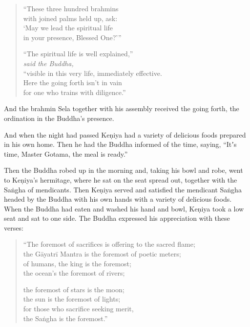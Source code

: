\documentclass[12pt,openany]{book}%
\newcommand*{\scspeaker}[1]{\hspace{2em}\textit{#1}}
\begin{document}
\begin{verse}
“These three hundred brahmins \\
with joined palms held up, ask: \\
‘May we lead the spiritual life \\
in your presence, Blessed One?’” 

“The spiritual life is well explained,” \\
\scspeaker{said the Buddha, }\\
“visible in this very life, immediately effective. \\
Here the going forth isn’t in vain \\
for one who trains with diligence.” 

%
\end{verse}

And the brahmin Sela together with his assembly received the going forth, the ordination in the Buddha’s presence. 

And when the night had passed \textsanskrit{Keṇiya} had a variety of delicious foods prepared in his own home. Then he had the Buddha informed of the time, saying, “Itʼs time, Master Gotama, the meal is ready.” 

Then the Buddha robed up in the morning and, taking his bowl and robe, went to \textsanskrit{Keṇiya}’s hermitage, where he sat on the seat spread out, together with the \textsanskrit{Saṅgha} of mendicants. Then \textsanskrit{Keṇiya} served and satisfied the mendicant \textsanskrit{Saṅgha} headed by the Buddha with his own hands with a variety of delicious foods. When the Buddha had eaten and washed his hand and bowl, \textsanskrit{Keṇiya} took a low seat and sat to one side. The Buddha expressed his appreciation with these verses: 

\begin{verse}%
“The foremost of sacrifices is offering to the sacred flame; \\
the \textsanskrit{Gāyatrī} Mantra is the foremost of poetic meters; \\
of humans, the king is the foremost; \\
the ocean’s the foremost of rivers; 

the foremost of stars is the moon; \\
the sun is the foremost of lights; \\
for those who sacrifice seeking merit, \\
the \textsanskrit{Saṅgha} is the foremost.” 

%
\end{verse}
\end{document}
